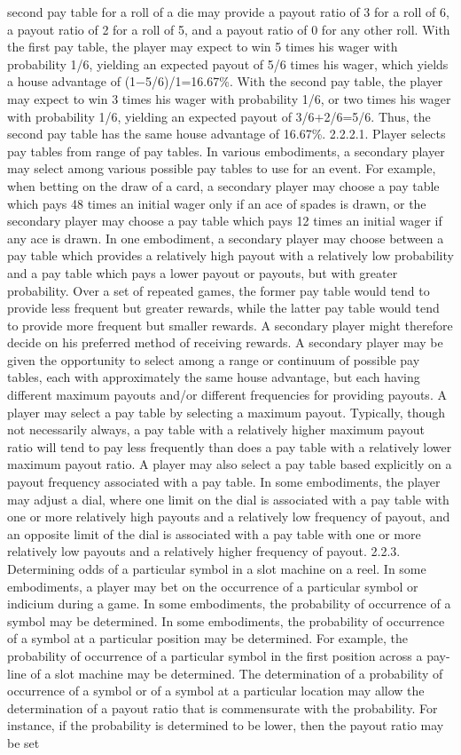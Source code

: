 \documentclass[11pt,a4paper]{article}
\begin{document}
second pay table for a roll of a die may provide a payout ratio of 3 for a roll of 6, a payout ratio of 2 for a roll of 5, and a payout ratio of 0 for any other roll. With the first pay table, the player may expect to win 5 times his wager with probability 1/6, yielding an expected payout of 5/6 times his wager, which yields a house advantage of (1−5/6)/1=16.67\%. With the second pay table, the player may expect to win 3 times his wager with probability 1/6, or two times his wager with probability 1/6, yielding an expected payout of 3/6+2/6=5/6. Thus, the second pay table has the same house advantage of 16.67\%. 2.2.2.1. Player selects pay tables from range of pay tables. In various embodiments, a secondary player may select among various possible pay tables to use for an event. For example, when betting on the draw of a card, a secondary player may choose a pay table which pays 48 times an initial wager only if an ace of spades is drawn, or the secondary player may choose a pay table which pays 12 times an initial wager if any ace is drawn. In one embodiment, a secondary player may choose between a pay table which provides a relatively high payout with a relatively low probability and a pay table which pays a lower payout or payouts, but with greater probability. Over a set of repeated games, the former pay table would tend to provide less frequent but greater rewards, while the latter pay table would tend to provide more frequent but smaller rewards. A secondary player might therefore decide on his preferred method of receiving rewards. A secondary player may be given the opportunity to select among a range or continuum of possible pay tables, each with approximately the same house advantage, but each having different maximum payouts and/or different frequencies for providing payouts. A player may select a pay table by selecting a maximum payout. Typically, though not necessarily always, a pay table with a relatively higher maximum payout ratio will tend to pay less frequently than does a pay table with a relatively lower maximum payout ratio. A player may also select a pay table based explicitly on a payout frequency associated with a pay table. In some embodiments, the player may adjust a dial, where one limit on the dial is associated with a pay table with one or more relatively high payouts and a relatively low frequency of payout, and an opposite limit of the dial is associated with a pay table with one or more relatively low payouts and a relatively higher frequency of payout. 2.2.3. Determining odds of a particular symbol in a slot machine on a reel. In some embodiments, a player may bet on the occurrence of a particular symbol or indicium during a game. In some embodiments, the probability of occurrence of a symbol may be determined. In some embodiments, the probability of occurrence of a symbol at a particular position may be determined. For example, the probability of occurrence of a particular symbol in the first position across a pay-line of a slot machine may be determined. The determination of a probability of occurrence of a symbol or of a symbol at a particular location may allow the determination of a payout ratio that is commensurate with the probability. For instance, if the probability is determined to be lower, then the payout ratio may be set 
\end{document}
